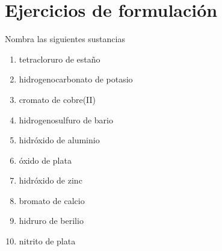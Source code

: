 \section{Ejercicios de formulación}

\begin{exercise}[
    tags    = {inorgánica,formulación,múltiple,2B},
    topics  = {química inorgánica,formulación,nomenclatura},
    source  = {Química 2B SAN 2016, p372, e12},
  ]
  Nombra las siguientes sustancias

  \begin{enumerate}
    \item tetracloruro de estaño
    \item hidrogenocarbonato de potasio
    \item cromato de cobre(II)
    \item hidrogenosulfuro de bario
    \item hidróxido de aluminio
    \item óxido de plata
    \item hidróxido de zinc
    \item bromato de calcio
    \item hidruro de berilio
    \item nitrito de plata
  \end{enumerate}
\end{exercise}

\begin{solution}
  \begin{enumerate}\begin{multicols}{2}
    \item {}
    \item {}
    \item {}
    \item {}
    \item {}
    \item {}
    \item {}
    \item {}
    \item {}
    \item {}
  \end{multicols}\end{enumerate}
\end{solution}




